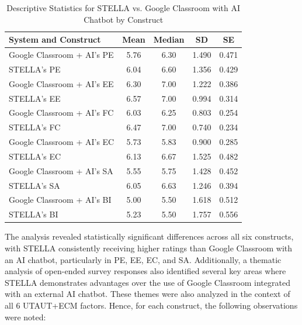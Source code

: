 \documentclass[sigconf,natbib=true]{acmart}
\begin{document}
\begin{table}
  \caption{Descriptive Statistics for STELLA vs. Google Classroom with AI Chatbot by Construct}\label{tab:stats}
  \begin{tabular}{lcccc}
    \toprule
    \textbf{System and Construct} & \textbf{Mean} & \textbf{Median} & \textbf{SD} & \textbf{SE} \\
    \midrule
    Google Classroom + AI's PE & 5.76 & 6.30 & 1.490 & 0.471 \\
    STELLA's PE & 6.04 & 6.60 & 1.356 & 0.429 \\
    \midrule
    Google Classroom + AI's EE & 6.30 & 7.00 & 1.222 & 0.386 \\
    STELLA's EE & 6.57 & 7.00 & 0.994 & 0.314 \\
    \midrule
    Google Classroom + AI's FC & 6.03 & 6.25 & 0.803 & 0.254 \\
    STELLA's FC & 6.47 & 7.00 & 0.740 & 0.234 \\
    \midrule
    Google Classroom + AI's EC & 5.73 & 5.83 & 0.900 & 0.285 \\
    STELLA's EC & 6.13 & 6.67 & 1.525 & 0.482 \\
    \midrule
    Google Classroom + AI's SA & 5.55 & 5.75 & 1.428 & 0.452 \\
    STELLA's SA & 6.05 & 6.63 & 1.246 & 0.394 \\
    \midrule
    Google Classroom + AI's BI & 5.00 & 5.50 & 1.618 & 0.512 \\
    STELLA's BI & 5.23 & 5.50 & 1.757 & 0.556 \\
    \bottomrule
  \end{tabular}
\end{table}

The analysis revealed statistically significant differences across all six constructs, with STELLA consistently receiving higher ratings than Google Classroom with an AI chatbot, particularly in PE, EE, EC, and SA\@. Additionally, a thematic analysis of open-ended survey responses also identified several key areas where STELLA demonstrates advantages over the use of Google Classroom integrated with an external AI chatbot. These themes were also analyzed in the context of all 6 UTAUT+ECM factors. Hence, for each construct, the following observations were noted:
\end{document}
